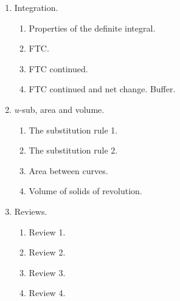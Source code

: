\documentclass[../main.tex]{subfiles}
\begin{document}
\begin{multicols}{2}
\begin{enumerate}[wide, label={\textbf{Week \arabic*}.}]
    \item Integration.
      \begin{enumerate}[resume]
        \item Properties of the definite integral.
        \item FTC.
        \item FTC continued.
        \item FTC continued and net change. Buffer.
      \end{enumerate}

    \item \(u\)-sub, area and volume.
      \begin{enumerate}[resume]
        \item The substitution rule 1.
        \item The substitution rule 2.
        \item Area between curves.
        \item Volume of solids of revolution.
      \end{enumerate}

    \item Reviews.
      \begin{enumerate}[resume]
        \item Review 1.
        \item Review 2.
        \item Review 3.
        \item Review 4.
      \end{enumerate}
  \end{enumerate}
\end{multicols}
\clearpage
\end{document}
